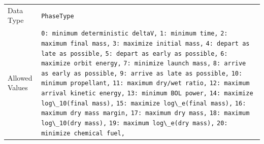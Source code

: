 \begin{enumerate}
        \begin{table}[H]
            \hspace{2cm}
            \begin{tabular}{lp{5cm}}
            Data Type & \verb|PhaseType| \\
            Allowed Values & \verb|0: minimum deterministic deltaV,| \newline
                             \verb|1: minimum time,| \newline
                             \verb|2: maximum final mass,| \newline
                             \verb|3: maximize initial mass,| \newline
                             \verb|4: depart as late as possible,| \newline
                             \verb|5: depart as early as possible,| \newline
                             \verb|6: maximize orbit energy,| \newline
                             \verb|7: minimize launch mass,| \newline
                             \verb|8: arrive as early as possible,| \newline
                             \verb|9: arrive as late as possible,| \newline
                             \verb|10: minimum propellant,| \newline
                             \verb|11: maximum dry/wet ratio,| \newline
                             \verb|12: maximum arrival kinetic energy,| \newline
                             \verb|13: minimum BOL power,| \newline
                             \verb|14: maximize log\_10(final mass),| \newline
                             \verb|15: maximize log\_e(final mass),| \newline
                             \verb|16: maximum dry mass margin,| \newline
                             \verb|17: maximum dry mass,| \newline
                             \verb|18: maximum log\_10(dry mass),| \newline
                             \verb|19: maximum log\_e(dry mass),| \newline
                             \verb|20: minimize chemical fuel,| \newline

\end{tabular}
\end{table}
\end{enumerate}
